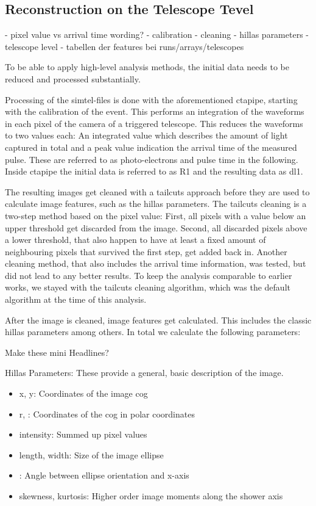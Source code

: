 \subsection{Reconstruction on the Telescope Tevel}
- pixel value vs arrival time wording?
- calibration
- cleaning
- hillas parameters 
- telescope level
- tabellen der features bei runs/arrays/telescopes

To be able to apply high-level analysis methods, the initial data 
needs to be reduced and processed substantially.

Processing of the simtel-files is done with the aforementioned ctapipe, starting with 
the calibration of the event. This performs an integration of the waveforms in 
each pixel of the camera of a triggered telescope. 
This reduces the waveforms to two values each: An integrated value which describes 
the amount of light captured in total and a peak value indication the arrival 
time of the measured pulse. These are referred to as 
photo-electrons and pulse time in the following.
Inside ctapipe the initial data is referred to as R1
and the resulting data as dl1. 

The resulting images get cleaned with a tailcuts approach before they are
used to calculate image features, such as the hillas parameters.
The tailcuts cleaning is a two-step method based on the pixel value:
First, all pixels with a value below an upper threshold get discarded from 
the image. Second, all discarded pixels above a lower threshold, that also 
happen to have at least a fixed amount of neighbouring pixels 
that survived the first step, get added back in.
Another cleaning method, that also includes the arrival time information, 
was tested, but did not lead to any better results.
To keep the analysis comparable to earlier works, we stayed with 
the tailcuts cleaning algorithm, which was the default algorithm at the time 
of this analysis.

After the image is cleaned, image features get calculated.
This includes the classic hillas parameters among others.
In total we calculate the following parameters:

Make these mini Headlines?

Hillas Parameters:
These provide a general, basic description of the image.
\begin{itemize}
    \item{x, y: Coordinates of the image cog}
    \item{r, \phi: Coordinates of the cog in polar coordinates}
    \item{intensity: Summed up pixel values}
    \item{length, width: Size of the image ellipse}
    \item{\psi: Angle between ellipse orientation and x-axis}
    \item{skewness, kurtosis: Higher order image moments along the shower axis}
\end{itemize}

